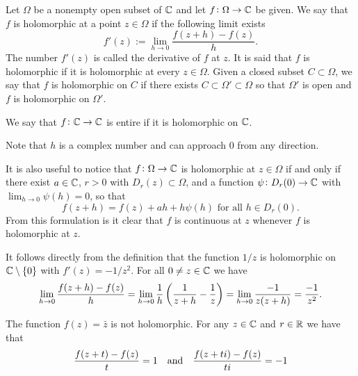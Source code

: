 \documentclass[11pt,a4paper]{article}
\begin{document}
\begin{definition}
  Let $\Omega$ be a nonempty open subset of $\mathbb{C}$ and let 
  $f \colon \Omega \to \mathbb{C}$ be given.
  We say that $f$ is holomorphic at a point $z \in \Omega$
  if the following limit exists
  \[
      f'(z) := \lim_{h \to 0} \frac{f(z + h) - f(z)}{h}.
  \]
  The number $f'(z)$ is called the derivative of $f$ at $z$.
  It is said that $f$ is holomorphic if it is holomorphic at every
  $z \in \Omega$.
  Given a closed subset $C \subset \Omega$, we say that $f$ is holomorphic
  on $C$ if there exists $C \subset \Omega' \subset \Omega$ so that
  $\Omega'$ is open and $f$ is holomorphic on $\Omega'$.
\end{definition}

\begin{definition}
  We say that $f \colon \mathbb{C} \to \mathbb{C}$ is entire if it is holomorphic on $\mathbb{C}$.
\end{definition}

\begin{remark}
  Note that $h$ is a complex number and can approach $0$ from any direction.
\end{remark}

\begin{remark}
  It is also useful to notice that $f \colon \Omega \to \mathbb{C}$ is holomorphic
  at $z \in \Omega$ if and only if there exist $a \in \mathbb{C}$, $r > 0$ with
  $D_r(z) \subset \Omega$, and a function $\psi \colon D_r(0) \to \mathbb{C}$ with
  $\lim_{h \to 0} \psi(h) = 0$, so that
  \[
    f(z + h) = f(z) + ah + h \psi(h) \text{ for all } h \in D_r(0).
  \]
  From this formulation is it clear that $f$ is continuous at $z$ whenever
  $f$ is holomorphic at $z$.
\end{remark}

\begin{example}
  It follows directly from the definition that the function $1/z$ is holomorphic
  on $\mathbb{C} \setminus \set{0}$ with $f'(z) = -1/z^2$. For all $0 \neq z \in \mathbb{C}$
  we have
  \[
    \lim_{h \to 0} \frac{f(z + h) - f(z)}{h} =
    \lim_{h \to 0} \frac{1}{h} \del{\frac{1}{z + h} - \frac{1}{z}} =
    \lim_{h \to 0} \frac{-1}{z (z + h)} =
    \frac{-1}{z^2}.
  \]
\end{example}

\begin{example}
  The function $f(z) = \bar z$ is not holomorphic. For any $z \in \mathbb{C}$ and
  $r \in \mathbb{R}$ we have that
  \[
    \frac{f(z + t) - f(z)}{t} = 1 \quad \text{and} \quad
    \frac{f(z + t i) - f(z)}{t i} = -1
  \]
\end{example}
\end{document}
